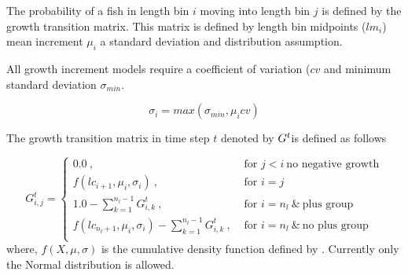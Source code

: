 The probability of a fish in length bin \(i\) moving into length bin \(j\) is defined by the growth transition matrix. This matrix is defined by length bin midpoints (\(lm_i\)) mean increment \(\mu_i\) a standard deviation and distribution assumption.

All growth increment models require a coefficient of variation (\(cv\) and minimum standard deviation \(\sigma_{min}\). 

\[
\sigma_i = max(\sigma_{min}, \mu_i cv)
\]


The growth transition matrix in time step \(t\) denoted by \(\boldmath{G^t}\)is defined as follows

\begin{equation}
G^t_{i,j} = 
\begin{cases}
0.0 \ , & \text{ for } j < i \ \text{no negative growth}\\
f(lc_{i + 1},\mu_i, \sigma_i) \ , & \text{ for } i = j \\
1.0 - \sum\limits_{k = 1}^{n_l - 1}G^t_{i,k} \ , & \text{ for } i = n_l \ \& \ \text{plus group} \\
f(lc_{n_l + 1},\mu_i, \sigma_i) - \sum\limits_{k = 1}^{n_l - 1}G^t_{i,k} \ , & \text{ for } i = n_l \ \&  \  \text{no plus group} \\		
\end{cases}
\end{equation}
where, \(f(X,\mu, \sigma)\) is the cumulative density function defined by . Currently only the Normal distribution is allowed.

